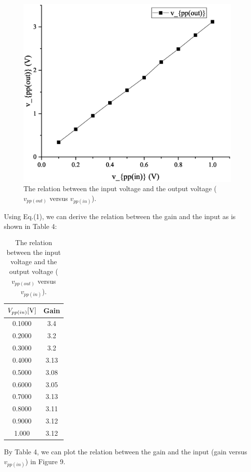 \documentclass[a4paper]{report}
\begin{document}
	\begin{figure}[H]
		\centering
		\includegraphics[width=1\linewidth]{8.eps}
		\caption{The relation between the input voltage and the output voltage ($v_{pp(out)}$ versus $v_{pp(in)}$).}
	\end{figure}
	Using Eq.(1), we can derive the relation between the gain and the input as is shown in Table 4:
	\begin{table}[H]
		\centering
		\begin{tabular}{|c|c|}
			\hline
			$V_{pp(in)}[\rm{V}]$&Gain\\
			\hline
			0.1000&3.4\\
			\hline
			0.2000&3.2\\
			\hline
			0.3000&3.2\\
			\hline
			0.4000&3.13\\
			\hline
			0.5000&3.08\\
			\hline
			0.6000&3.05\\
			\hline
			0.7000&3.13\\
			\hline
			0.8000&3.11\\
			\hline
			0.9000&3.12\\
			\hline
			1.000&3.12\\
			\hline
		\end{tabular}
		\caption{The relation between the input voltage and the output voltage ($v_{pp(out)}$ versus $v_{pp(in)}$).}
	\end{table}
	By Table 4, we can plot the relation between the gain and the input (gain versus $v_{pp(in)}$) in Figure 9.
\end{document}
